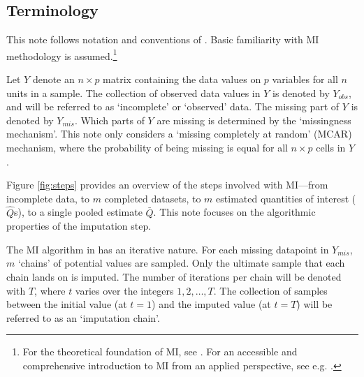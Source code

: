 \documentclass[article]{jss}
\begin{document}
\subsection{Terminology} \label{sec:terms}

 
This note follows notation and conventions of  \citep{mice}. %
Basic familiarity with MI methodology is assumed.\footnote{For the theoretical foundation of MI, see \cite{rubin87}. For an accessible and comprehensive introduction to MI from an applied perspective, see e.g. \cite{buur18}.} 

Let $Y$ denote an $n \times p$ matrix containing the data values on $p$ variables for all $n$ units in a sample. The collection of observed data values in $Y$ is denoted by $Y_{obs}$, and will be referred to as `incomplete' or `observed' data. The missing part of $Y$ is denoted by $Y_{mis}$. Which parts of $Y$ are missing is determined by the `missingness mechanism'. %
This note only considers a `missing completely at random' (MCAR) mechanism, where the probability of being missing is equal for all $n \times p$ cells in $Y$ \citep{rubin87}.


Figure \ref{fig:steps} provides an overview of the steps involved with MI---from incomplete data, to $m$ completed datasets, to $m$ estimated quantities of interest ($\hat{Q}$s), to a single pooled estimate $\bar{Q}$.
This note focuses on the algorithmic properties of the imputation step. 

The MI algorithm in  has an iterative nature. For each missing datapoint in $Y_{mis}$, $m$ `chains' of potential values are sampled. Only the ultimate sample that each chain lands on is imputed. The number of iterations per chain will be denoted with $T$, where $t$ varies over the integers $1, 2, \dots, T$.  %
The collection of samples between the initial value (at $t=1$) and the imputed value (at $t=T$) will be referred to as an `imputation chain'. 
\end{document}
